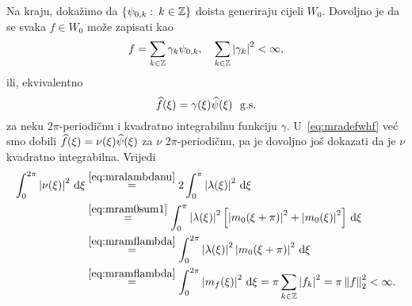 \documentclass[main.tex]{subfiles}
\begin{document}
Na kraju, dokažimo da \( \left\{ \psi_{0,k} \, \colon \, k \in \mathbb{Z} \right\} \)
doista generiraju cijeli \( W_0 \). Dovoljno je da se svaka \( f \in W_0 \)
može zapisati kao
\begin{equation}
	f = \sum_{k \in \mathbb{Z}} \gamma_k \psi_{0,k}, \quad \sum_{k \in \mathbb{Z}} \left| {\gamma_k} \right|^2 < \infty,
\end{equation}
ili, ekvivalentno
\begin{equation}
	\widehat{f}(\xi) = \gamma(\xi) \widehat{\psi}(\xi) \ \ \mathrm{g.s.}
\end{equation}
za neku \( 2\pi \)-periodičnu i kvadratno integrabilnu funkciju \( \gamma \).
U~\eqref{eq:mradefwhf} već smo dobili
\( \widehat{f}(\xi) = \nu(\xi) \widehat{\psi}(\xi) \) za \( \nu \) \( 2\pi \)-periodičnu,
pa je dovoljno još dokazati da je \( \nu \) kvadratno integrabilna.
Vrijedi
\begin{align}
	\int_0^{2\pi} \left| {\nu(\xi)} \right|^2 \,\mathrm d \xi & \stackrel{\scriptstyle {\eqref{eq:mralambdanu}}}{=} 2\int_0^\pi \left| {\lambda(\xi)} \right|^2 \,\mathrm d \xi \\
	                                      & \stackrel{\scriptstyle {\eqref{eq:mram0sum1}}}{=}
	\int_0^\pi \left| {\lambda(\xi)} \right|^2 \left[ \left| {m_0(\xi + \pi)} \right|^2 + \left| {m_0(\xi)} \right|^2 \right] \,\mathrm d \xi                     \\
	                                      & \stackrel{\scriptstyle {\eqref{eq:mramflambda}}}{=}
	\int_0^{2\pi} \left| {\lambda(\xi)} \right|^2 \left| {m_0(\xi + \pi)} \right|^2 \,\mathrm d \xi                                                    \\
	                                      & \stackrel{\scriptstyle {\eqref{eq:mramflambda}}}{=}
	\int_0^{2\pi} \left| {m_f(\xi)} \right|^2 \,\mathrm d \xi = \pi \sum_{k \in \mathbb{Z}} \left| {f_k} \right|^2 = \pi \left\lVert f\right\rVert_2^2 < \infty.
\end{align}
\end{document}
